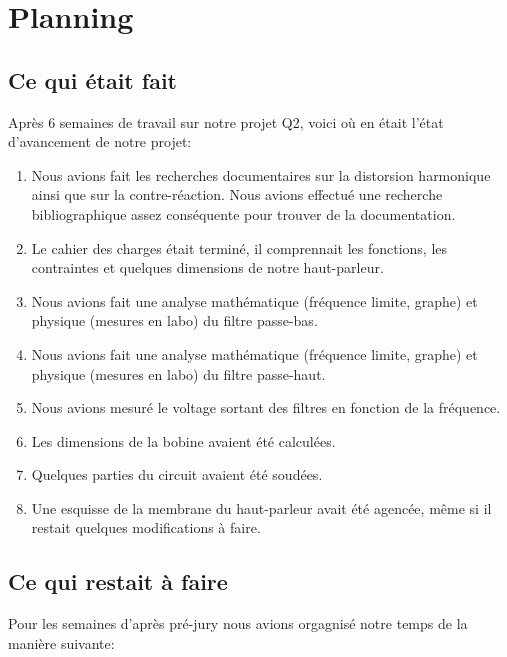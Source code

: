

\section{Planning}

\subsection{Ce qui était fait}
Après 6 semaines de travail sur notre projet Q2, voici où en était l'état d'avancement de notre projet:

\begin{enumerate}
	\item Nous avions fait les recherches documentaires sur la distorsion harmonique ainsi que sur la contre-réaction.
	Nous avions effectué une recherche bibliographique assez conséquente pour trouver de la documentation.
	\item Le cahier des charges était terminé, il comprennait les fonctions, les contraintes et quelques dimensions de notre haut-parleur.
	\item Nous avions fait une analyse mathématique (fréquence limite, graphe) et physique (mesures en labo) du filtre passe-bas. 
	\item Nous avions fait une analyse mathématique (fréquence limite, graphe) et physique (mesures en labo) du filtre passe-haut.
	\item Nous avions mesuré le voltage sortant des filtres en fonction de la fréquence.
	\item Les dimensions de la bobine avaient été calculées.
	\item Quelques parties du circuit avaient été soudées.
	\item Une esquisse de la membrane du haut-parleur avait été agencée, même si il restait quelques modifications à faire.
\end{enumerate}

\subsection{Ce qui restait à faire}

Pour les semaines d'après pré-jury nous avions orgagnisé notre temps de la manière suivante:

